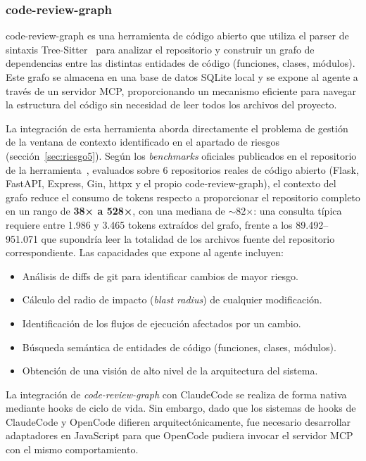 \documentclass[11pt, letterpaper]{article}
\begin{document}
\subsubsection{code-review-graph}
\label{sec:code_review_graph}
code-review-graph \cite{code_review_graph_2025} es una herramienta de código abierto que utiliza el parser de sintaxis Tree-Sitter~\cite{tree_sitter} para analizar el repositorio y construir un grafo de dependencias entre las distintas entidades de código (funciones, clases, módulos). Este grafo se almacena en una base de datos SQLite local y se expone al agente a través de un servidor MCP, proporcionando un mecanismo eficiente para navegar la estructura del código sin necesidad de leer todos los archivos del proyecto.

La integración de esta herramienta aborda directamente el problema de gestión de la ventana de contexto identificado en el apartado de riesgos (sección~\ref{sec:riesgo5}). Según los \textit{benchmarks} oficiales publicados en el repositorio de la herramienta~\cite{code_review_graph_2025}, evaluados sobre 6 repositorios reales de código abierto (Flask, FastAPI, Express, Gin, httpx y el propio code-review-graph), el contexto del grafo reduce el consumo de tokens respecto a proporcionar el repositorio completo en un rango de \textbf{38× a 528×}, con una mediana de $\sim$82×: una consulta típica requiere entre 1.986 y 3.465 tokens extraídos del grafo, frente a los 89.492--951.071 que supondría leer la totalidad de los archivos fuente del repositorio correspondiente. Las capacidades que expone al agente incluyen:
\begin{itemize}
    \item Análisis de diffs de git para identificar cambios de mayor riesgo.
    \item Cálculo del radio de impacto (\textit{blast radius}) de cualquier modificación.
    \item Identificación de los flujos de ejecución afectados por un cambio.
    \item Búsqueda semántica de entidades de código (funciones, clases, módulos).
    \item Obtención de una visión de alto nivel de la arquitectura del sistema.
\end{itemize}

La integración de \textit{code-review-graph} con ClaudeCode se realiza de forma nativa mediante hooks de ciclo de vida. Sin embargo, dado que los sistemas de hooks de ClaudeCode y OpenCode difieren arquitectónicamente, fue necesario desarrollar adaptadores en JavaScript para que OpenCode pudiera invocar el servidor MCP con el mismo comportamiento.
\end{document}
